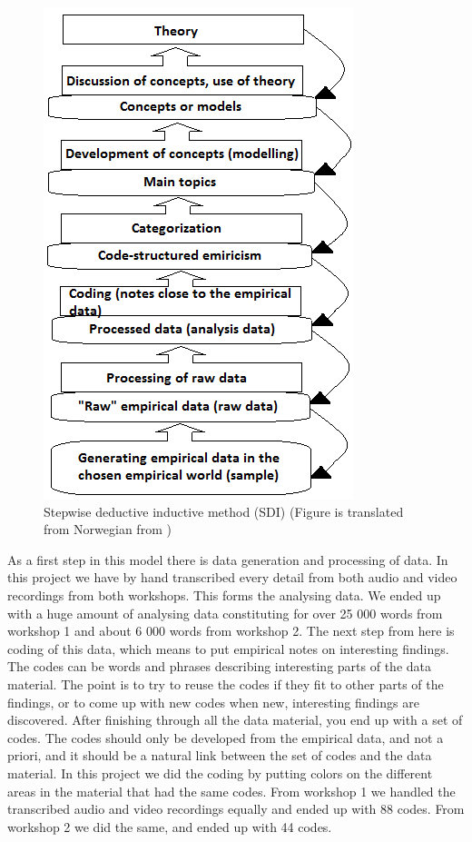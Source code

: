 \begin{figure}
\centering
\includegraphics[scale=0.8]{sdi}
\caption[Stepwise deductive inductive method (SDI)]{Stepwise deductive inductive method (SDI) (Figure is translated from Norwegian from \cite{tjora})}
\label{fig:sdi}
\end{figure}

As a first step in this model there is data generation and processing of data. In this project we have by hand transcribed every detail from both audio and video recordings from both workshops. This forms the analysing data. We ended up with a huge amount of analysing data constituting for over 25 000 words from workshop 1 and about 6 000 words from workshop 2. The next step from here is coding of this data, which means to put empirical notes on interesting findings. The codes can be words and phrases describing interesting parts of the data material. The point is to try to reuse the codes if they fit to other parts of the findings, or to come up with new codes when new, interesting findings are discovered. After finishing through all the data material, you end up with a set of codes. The codes should only be developed from the empirical data, and not a priori, and it should be a natural link between the set of codes and the data material. In this project we did the coding by putting colors on the different areas in the material that had the same codes. From workshop 1 we handled the transcribed audio and video recordings equally and ended up with 88 codes. From workshop 2 we did the same, and ended up with 44 codes.

